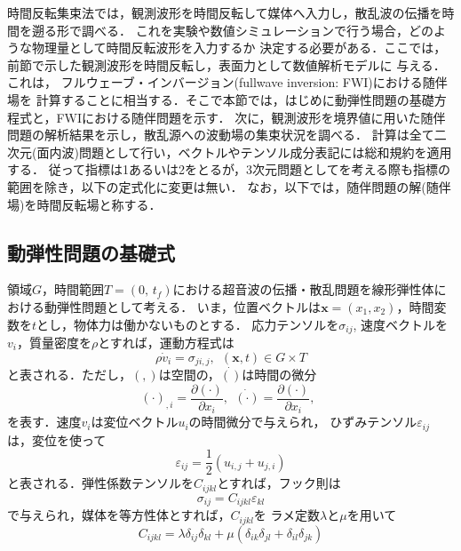 時間反転集束法では，観測波形を時間反転して媒体へ入力し，散乱波の伝播を時間を遡る形で調べる．
これを実験や数値シミュレーションで行う場合，どのような物理量として時間反転波形を入力するか
決定する必要がある．ここでは，前節で示した観測波形を時間反転し，表面力として数値解析モデルに
与える．これは， フルウェーブ・インバージョン(fullwave inversion: FWI)における随伴場を
計算することに相当する．そこで本節では，はじめに動弾性問題の基礎方程式と，FWIにおける随伴問題を示す．
次に，観測波形を境界値に用いた随伴問題の解析結果を示し，散乱源への波動場の集束状況を調べる．
計算は全て二次元(面内波)問題として行い，ベクトルやテンソル成分表記には総和規約を適用する．
従って指標は1あるいは2をとるが，3次元問題としてを考える際も指標の範囲を除き，以下の定式化に変更は無い．
なお，以下では，随伴問題の解(随伴場)を時間反転場と称する．
\subsection{動弾性問題の基礎式}
領域$G$，時間範囲$T=(0,\, t_f)$における超音波の伝播・散乱問題を線形弾性体における動弾性問題として考える．
いま，位置ベクトルは$\boldsymbol{x}=(x_1,x_2)$，時間変数を$t$とし，物体力は働かないものとする．
応力テンソルを$\sigma_{ij}$, 速度ベクトルを$v_i$，質量密度を$\rho$とすれば，運動方程式は
\begin{equation}
	\rho \dot{v}_i=\sigma_{ji,j}, \ \ (\boldsymbol{x},t)\in G\times T
	\label{eqn:}
\end{equation}
と表される．ただし，$(,)$は空間の，$\dot{()}$は時間の微分
\begin{equation}
	(\cdot)_{,i}=\frac{\partial (\cdot)}{\partial x_i}, \ \ 
	\dot{(\cdot)}=\frac{\partial (\cdot)}{\partial x_i}, \ \ 
	\label{eqn:}
\end{equation}
を表す．速度$v_i$は変位ベクトル$u_i$の時間微分で与えられ，
ひずみテンソル$\varepsilon_{ij}$は，変位を使って
\begin{equation}
	\varepsilon_{ij}=\frac{1}{2}(u_{i,j}+u_{j,i})
	\label{eqn:FWD}
\end{equation}
と表される．弾性係数テンソルを$C_{ijkl}$とすれば，フック則は
\begin{equation}
	\sigma_{ij}=C_{ijkl}\varepsilon_{kl}
	\label{eqn:}
\end{equation}
で与えられ，媒体を等方性体とすれば，$C_{ijkl}$を
ラメ定数$\lambda$と$\mu$を用いて
\begin{equation}
	C_{ijkl}=\lambda \delta_{ij}\delta_{kl} +
	\mu (
	\delta_{ik}\delta_{jl}
	+
	\delta_{il}\delta_{jk} 
	)
	\label{eqn:}
\end{equation}
